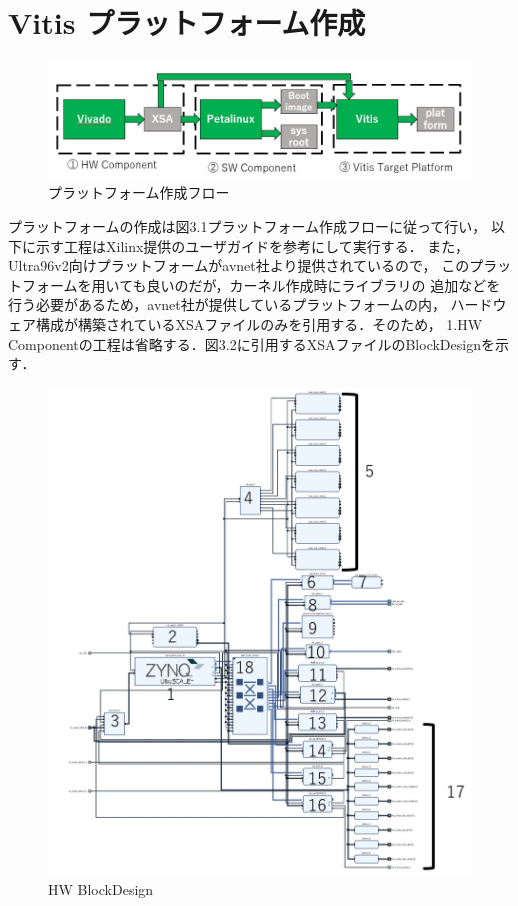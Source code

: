 \documentclass[11pt,a4j]{jreport}
\begin{document}
\section{Vitis プラットフォーム作成}
\begin{figure}[H]
  \center
  \includegraphics[scale = 0.8]{pict/pict.jpg}
  \caption{プラットフォーム作成フロー}
\end{figure}
プラットフォームの作成は図3.1プラットフォーム作成フローに従って行い，
以下に示す工程はXilinx提供のユーザガイド\cite{Xilinx-platform}を参考にして実行する．
また，Ultra96v2向けプラットフォームがavnet社より提供されているので，
このプラットフォームを用いても良いのだが，カーネル作成時にライブラリの
追加などを行う必要があるため，avnet社が提供しているプラットフォームの内，
ハードウェア構成が構築されているXSAファイルのみを引用する．そのため，
1.HW Componentの工程は省略する．図3.2に引用するXSAファイルのBlockDesignを示す．
\begin{figure}[H]
  \center
  \includegraphics[scale = 0.8]{pict/pict2.jpg}
  \caption{HW BlockDesign}
\end{figure}
\end{document}
